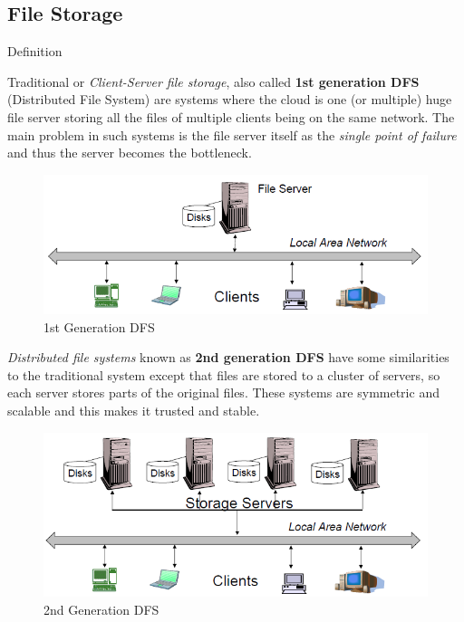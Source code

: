 \subsection{File Storage}

Definition

Traditional or \textit{Client-Server file storage}, also called \textbf{1st generation DFS} (Distributed File System) are systems where the cloud is one (or multiple) huge file server storing all the files of multiple clients being on the same network. The main problem in such systems is the file server itself as the \textit{single point of failure} and thus the server becomes the bottleneck.

	\begin{figure}[ht]
		\begin{center}
		\includegraphics[scale=0.8]{Talk5/1st_gen_dfs.PNG}
		\end{center}
		\caption{1st Generation DFS \cite{p2pfswu}}
		\label{1st_gen_dfs}
	\end{figure}

\textit{Distributed file systems} known as \textbf{2nd generation DFS} have some similarities to the traditional system except that files are stored to a cluster of servers, so each server stores parts of the original files. These systems are symmetric and scalable and this makes it trusted and stable.

	\begin{figure}[ht]
		\begin{center}
		\includegraphics[scale=0.8]{Talk5/2nd_gen_dfs.PNG}
		\end{center}
		\caption{2nd Generation DFS \cite{p2pfswu}}
		\label{2nd_gen_dfs}
	\end{figure}
	
